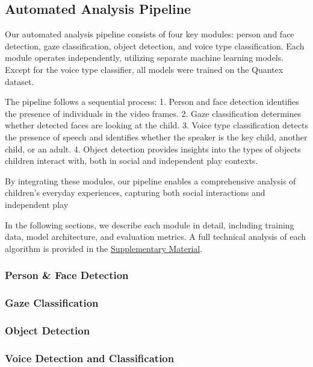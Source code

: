 \documentclass[
  man,floatsintext]{apa6}
\begin{document}
\subsection{Automated Analysis Pipeline}\label{automated-analysis-pipeline}

Our automated analysis pipeline consists of four key modules: person and face detection, gaze classification, object detection, and voice type classification. Each module operates independently, utilizing separate machine learning models. Except for the voice type classifier, all models were trained on the Quantex dataset.

The pipeline follows a sequential process:
1. Person and face detection identifies the presence of individuals in the video frames.
2. Gaze classification determines whether detected faces are looking at the child.
3. Voice type classification detects the presence of speech and identifies whether the speaker is the key child, another child, or an adult.
4. Object detection provides insights into the types of objects children interact with, both in social and independent play contexts.

By integrating these modules, our pipeline enables a comprehensive analysis of children's everyday experiences, capturing both social interactions and independent play

In the following sections, we describe each module in detail, including training data, model architecture, and evaluation metrics. A full technical analysis of each algorithm is provided in the \hyperref[supplementary-material]{Supplementary Material}.

\subsubsection{Person \& Face Detection}\label{person-face-detection}

\subsubsection{Gaze Classification}\label{gaze-classification}

\subsubsection{Object Detection}\label{object-detection}

\subsubsection{Voice Detection and Classification}\label{voice-detection-and-classification}
\end{document}
